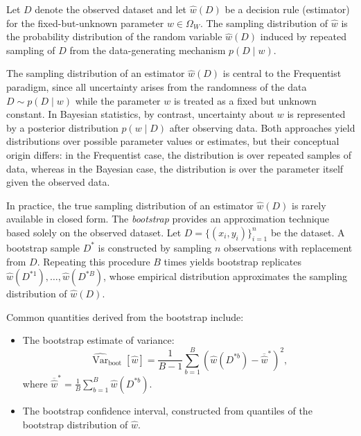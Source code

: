 \begin{definition}
	Let $D$ denote the observed dataset and let $\hat{w}(D)$ be a decision rule (estimator) for the fixed-but-unknown parameter $w\in\Omega_W$. The sampling distribution of $\hat{w}$ is the probability distribution of the random variable $\hat{w}(D)$ induced by repeated sampling of $D$ from the data-generating mechanism $p(D \mid w)$.	
\end{definition}

\begin{remark}
	The sampling distribution of an estimator $\hat{w}(D)$ is central to the Frequentist paradigm, since all uncertainty arises from the randomness of the data $D \sim p(D \mid w)$ while the parameter $w$ is treated as a fixed but unknown constant. In Bayesian statistics, by contrast, uncertainty about $w$ is represented by a posterior distribution $p(w \mid D)$ after observing data. Both approaches yield distributions over possible parameter values or estimates, but their conceptual origin differs: in the Frequentist case, the distribution is over repeated samples of data, whereas in the Bayesian case, the distribution is over the parameter itself given the observed data.
\end{remark}

\begin{example}
	In practice, the true sampling distribution of an estimator $\hat{w}(D)$ is rarely available in closed form. The \emph{bootstrap} provides an approximation technique based solely on the observed dataset. Let $D = \{(x_i,y_i)\}_{i=1}^n$ be the dataset. A bootstrap sample $D^{*}$ is constructed by sampling $n$ observations with replacement from $D$. Repeating this procedure $B$ times yields bootstrap replicates $\hat{w}(D^{*1}), \ldots, \hat{w}(D^{*B})$, whose empirical distribution approximates the sampling distribution of $\hat{w}(D)$. 
	
	Common quantities derived from the bootstrap include:
	\begin{itemize}
		\item The bootstrap estimate of variance:
		\begin{equation}
			\widehat{\operatorname{Var}}_{\mathrm{boot}}[\hat{w}] = \frac{1}{B-1}\sum_{b=1}^B \left(\hat{w}(D^{*b}) - \overline{\hat{w}}^{*}\right)^2,
		\end{equation}
		where $\overline{\hat{w}}^{*} = \frac{1}{B}\sum_{b=1}^B \hat{w}(D^{*b})$.
		\item The bootstrap confidence interval, constructed from quantiles of the bootstrap distribution of $\hat{w}$.
	\end{itemize}
\end{example}


